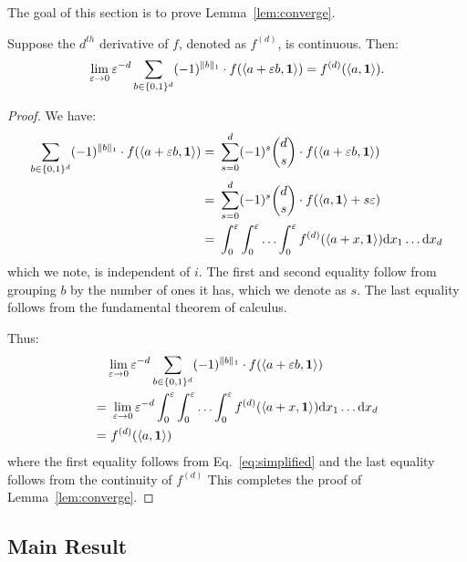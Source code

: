 The goal of this section is to prove Lemma~\ref{lem:converge}.
\begin{lemma}\label{lem:converge}

Suppose the $d^{th}$ derivative of $f$, denoted as $f^{(d)}$, is continuous. Then:
\begin{align*}
\lim_{\epsilon \rightarrow 0} \epsilon^{-d}  \sum_{b \in \{0, 1\}^d} (-1)^{\|b\|_1} \cdot f ( \langle a + \epsilon b, {\bf 1} \rangle  ) = f^{(d)}( \langle a , {\bf 1} \rangle ).
\end{align*}
\end{lemma}
\begin{proof}


We have:
\begin{align} \label{eq:simplified}
\sum_{b \in \{0, 1\}^d} (-1)^{\|b\|_1} \cdot f ( \langle a + \epsilon b, {\bf 1} \rangle  ) 
= & ~  \sum_{s=0}^d (-1)^s \binom{d}{s} \cdot f ( \langle a + \epsilon b, {\bf 1} \rangle  ) \notag \\
= & ~  \sum_{s=0}^d (-1)^s \binom{d}{s} \cdot f( \langle a , {\bf 1} \rangle + s \epsilon )  \notag \\
= & ~ \int_0^\epsilon \int_0^\epsilon \ldots \int_0^\epsilon f^{(d)}( \langle a+ x, {\bf 1}\rangle ) \d x_1 \ldots \d x_d 
\end{align}
which we note, is independent of $i$.  The first and second equality follow from grouping $b$ by the number of ones it has, which we denote as $s$. The last equality follows from the fundamental theorem of calculus.

Thus:
\begin{align} 
& \lim_{\epsilon \rightarrow 0} \epsilon^{-d}  \sum_{b \in \{0, 1\}^d} (-1)^{\|b\|_1} \cdot f ( \langle a + \epsilon b, {\bf 1} \rangle  ) \notag \\
 = & ~ \lim_{\epsilon \rightarrow 0} \epsilon^{-d} \int_0^\epsilon \int_0^\epsilon \ldots \int_0^\epsilon f^{(d)}( \langle a+ x, {\bf 1}\rangle ) \d x_1 \ldots \d x_d \notag \\
 = & ~ 
f^{(d)} (\langle a, \bf{1} \rangle ) \notag
\end{align}
where the first equality follows from Eq.~\eqref{eq:simplified} and the last equality follows from the continuity of $f^{(d)}$ This completes the proof of Lemma~\ref{lem:converge}.
\end{proof}





\subsection{Main Result}\label{sec:poly_main}

